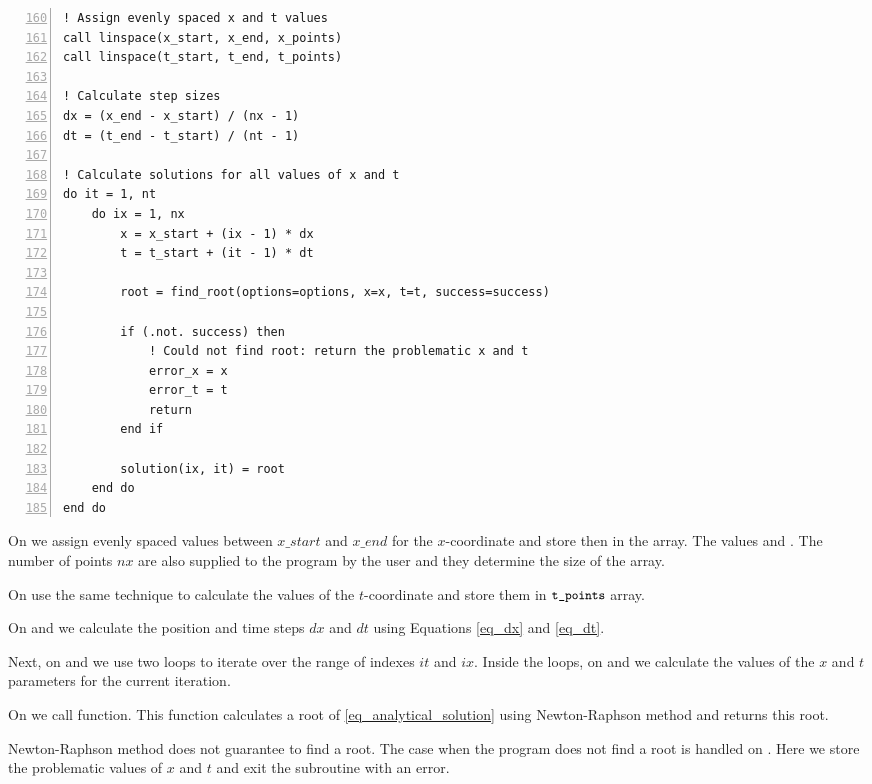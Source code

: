 \noindent\begin{minipage}{\linewidth}
\begin{lstlisting}[caption={Solving $v = \cos (x - v t )$ equation for various values of parameters $x$ and $t$ (\code{root\_finder.f90}).},frame=tlrb,label={code_solve_v_equation}, numbers=left, firstnumber=160]
! Assign evenly spaced x and t values
call linspace(x_start, x_end, x_points)
call linspace(t_start, t_end, t_points)

! Calculate step sizes
dx = (x_end - x_start) / (nx - 1)
dt = (t_end - t_start) / (nt - 1)

! Calculate solutions for all values of x and t
do it = 1, nt
    do ix = 1, nx
        x = x_start + (ix - 1) * dx
        t = t_start + (it - 1) * dt

        root = find_root(options=options, x=x, t=t, success=success)

        if (.not. success) then
            ! Could not find root: return the problematic x and t
            error_x = x
            error_t = t
            return
        end if

        solution(ix, it) = root
    end do
end do
\end{lstlisting}
\end{minipage}

On  we assign evenly spaced values between $x\_start$ and $x\_end$ for the $x$-coordinate and store then in the  array. The values  and . The number of points $nx$ are also supplied to the program by the user and they determine the size of the  array.

On  use the same technique to calculate the values of the $t$-coordinate and store them in $\texttt{\small t\_points}$ array.

On  and  we calculate the position and time steps $dx$ and $dt$ using Equations \ref{eq_dx} and \ref{eq_dt}.

Next, on  and  we use two loops to iterate over the range of indexes $it$ and $ix$. Inside the loops, on  and  we calculate the values of the $x$ and $t$ parameters for the current iteration.

On  we call  function. This function calculates a root of \autoref{eq_analytical_solution} using Newton-Raphson method and returns this root.

Newton-Raphson method does not guarantee to find a root. The case when the program does not find a root is handled on . Here we store the problematic values of $x$ and $t$ and exit the subroutine with an error.

